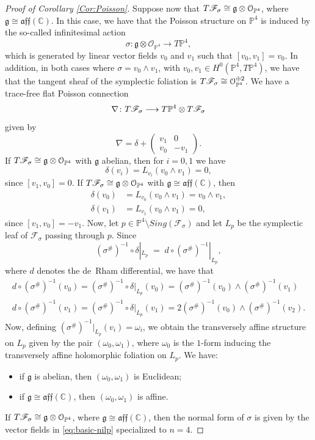 \documentclass[twoside]{amsart}
\numberwithin{equation}{section}
\def\PP{{\mathbb{P}}}
\def\OO{\mathcal{O}}
\newcommand{\sF}{\mathscr{F}}
\newcommand{\tF}{{\rm T}\sF}
\theoremstyle{definition}
\begin{document}
\begin{proof}[Proof of Corollary \ref{Cor:Poisson}]
Suppose now that $\tF_\sigma \cong \mathfrak{g}\otimes \OO_{\PP^{4}}$, where
$\mathfrak{g}\cong \mathfrak{aff}(\mathbb{C})$. In this case, we have that the
Poisson structure on $\PP^{4}$ is induced by the so-called infinitesimal action
\[
\sigma \colon \mathfrak{g}\otimes \OO_{\PP^{4}} \longrightarrow T\PP^{4},
\]
which is generated by linear vector fields $v_0$ and $v_1$ such that
$[v_0,v_1]=v_0$. In addition, in both cases where $\sigma=v_0\wedge v_1$, with
$v_0, v_1\in H^0(\PP^{4}, T\PP^{4})$, we have that the tangent sheaf of the
symplectic foliation is $\tF_\sigma \cong \OO_{\PP^{4}}^{\oplus 2}$. We have a
trace-free flat Poisson connection 
\[
\nabla\colon \tF_\sigma \longrightarrow T\PP^{4} \otimes \tF_\sigma
\]
given by 
\[
 \nabla =\delta +
 \begin{pmatrix}
   v_1 & 0 \\
   v_0 & -v_1
 \end{pmatrix}.
\]
If $\tF_\sigma \cong \mathfrak{g}\otimes \OO_{\PP^{4}}$ with $\mathfrak{g}$ abelian,
then for $i=0,1$ we have 
\[
 \delta(v_i)= L_{v_i} (v_0\wedge v_1 )= 0,
\]
since $[v_1,v_0]=0$. If $\tF_\sigma \cong \mathfrak{g}\otimes \OO_{\PP^{4}}$ with
$\mathfrak{g}\cong \mathfrak{aff}(\mathbb{C})$, then 
\begin{align*}
    \delta(v_0) &= L_{v_0} (v_0\wedge v_1 )= v_0\wedge v_1,\\
    \delta(v_1) &=L_{v_1} (v_0\wedge v_1 )=0,
\end{align*}
since $[v_1,v_0]=-v_1$. Now, let
$p\in \PP^{4}\setminus Sing(\sF_\sigma)$ and let $L_p$ be the symplectic leaf of
$\sF_\sigma$ passing through $p$. Since
\[
 (\sigma^{\#} )^{-1}\circ \delta |_{L_p}
 \;=\;
 d \circ (\sigma^{\#} )^{-1} |_{L_p},
\]
where $d$ denotes the de~Rham differential, we have that
\[
 \begin{matrix}
 d \circ (\sigma^{\#} )^{-1}(v_0)
 =
 (\sigma^{\#} )^{-1}\circ \delta |_{L_p} (v_0)
 =
 (\sigma^{\#} )^{-1}(v_0)\wedge (\sigma^{\#} )^{-1}( v_1)\\[4pt]
 d \circ (\sigma^{\#} )^{-1}(v_1)
 =
 (\sigma^{\#} )^{-1}\circ \delta |_{L_p} (v_1)
 =
 2 (\sigma^{\#} )^{-1}( v_0)\wedge (\sigma^{\#} )^{-1}(v_2).
\end{matrix} 
\]
Now, defining $(\sigma^{\#} )^{-1} |_{L_p} (v_i)=\omega_i$, we obtain the transversely
affine structure on $L_p$ given by the pair $(\omega_0,\omega_1)$, where $\omega_0$ is
the $1$-form inducing the transversely affine holomorphic foliation on $L_p$. We have:
\begin{itemize}
 \item if $\mathfrak{g}$ is abelian, then $(\omega_0,\omega_1)$ is Euclidean; 
 \item if $\mathfrak{g}\cong \mathfrak{aff}(\mathbb{C})$, then $(\omega_0,\omega_1)$
 is affine. 
\end{itemize}
If $\tF_\sigma \cong \mathfrak{g}\otimes \OO_{\PP^{4}}$, where
$\mathfrak{g}\cong \mathfrak{aff}(\mathbb{C})$, then the normal form of $\sigma$ is
given by the vector fields in \eqref{eq:basic-nilp} specialized to $n=4$.


\end{proof}
\end{document}
